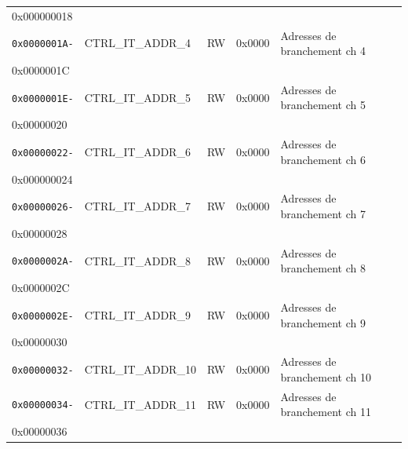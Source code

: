 \begin{table}[H]
\begin{tabular}{llllll}
		{0x000000018}        &                        &               &                &                                      \\
		\rhline
		\texttt{0x0000001A-} & CTRL\_IT\_ADDR\_4      & RW            & 0x0000         & Adresses de branchement ch 4         \\
		{0x0000001C}         &                        &               &                &                                      \\
		\rhline
		\texttt{0x0000001E-} & CTRL\_IT\_ADDR\_5      & RW            & 0x0000         & Adresses de branchement ch 5         \\
		{0x00000020}         &                        &               &                &                                      \\
		\rhline
		\texttt{0x00000022-} & CTRL\_IT\_ADDR\_6      & RW            & 0x0000         & Adresses de branchement ch 6         \\
		{0x000000024}        &                        &               &                &                                      \\
		\rhline
		\texttt{0x00000026-} & CTRL\_IT\_ADDR\_7      & RW            & 0x0000         & Adresses de branchement ch 7         \\
		{0x00000028}         &                        &               &                &                                      \\
		\rhline
		\texttt{0x0000002A-} & CTRL\_IT\_ADDR\_8      & RW            & 0x0000         & Adresses de branchement ch 8         \\
		{0x0000002C}         &                        &               &                &                                      \\
		\rhline
		\texttt{0x0000002E-} & CTRL\_IT\_ADDR\_9      & RW            & 0x0000         & Adresses de branchement ch 9         \\
		{0x00000030}         &                        &               &                &                                      \\
		\rhline
		\texttt{0x00000032-} & CTRL\_IT\_ADDR\_10     & RW            & 0x0000         & Adresses de branchement ch 10        \\
		\rhline
		\texttt{0x00000034-} & CTRL\_IT\_ADDR\_11     & RW            & 0x0000         & Adresses de branchement ch 11        \\
		{0x00000036}         &                        &               &                &                                      \\

\end{tabular}
\end{table}
